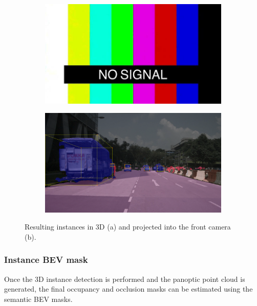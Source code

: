 \begin{figure}[h!]
    \centering
    \begin{subfigure}[b]{0.45\textwidth}
        \includegraphics[width=\textwidth]{images/shared/no_signal.jpg}
        \caption{}
        \label{fig:instance_scene_images_a}
    \end{subfigure}
    \hfill
    \begin{subfigure}[b]{0.45\textwidth}
        \includegraphics[width=\textwidth]{images/methodology/raw_cuboid_1.png}
        \caption{}
        \label{fig:instance_scene_images_b}
    \end{subfigure}

    \caption{Resulting instances in 3D (a) and projected into the front camera (b).}
    \label{fig:instance_scene_images}
\end{figure}


\subsubsection{Instance BEV mask}
Once the 3D instance detection is performed and the panoptic point cloud is generated, the final occupancy and occlusion masks can be estimated using the semantic BEV masks.

